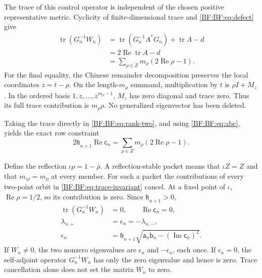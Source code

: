The trace of this control operator is independent of the chosen
positive representative metric.  Cyclicity of finite-dimensional
trace and \eqref{BF:BF:eq:defect} give
\begin{equation}
\begin{split}
\operatorname{tr}(G_n^{-1}W_n)
&=\operatorname{tr}(G_n^{-1}A^*G_n)
  +\operatorname{tr}A-d\\
&=2\operatorname{Re}\operatorname{tr}A-d\\
&=\sum_{\rho\in Z}m_\rho(2\operatorname{Re}\rho-1).
\end{split}
\tag{BF.23}\label{BF:BF:eq:trace-invariant}
\end{equation}
For the final equality, the Chinese remainder decomposition preserves
the local coordinates \(z=t-\rho\).  On the length-\(m_\rho\)
summand, multiplication by \(t\) is \(\rho I+M_z\).  In the ordered
basis \(1,z,\ldots,z^{m_\rho-1}\), \(M_z\) has zero diagonal and
trace zero.  Thus its full trace contribution is \(m_\rho\rho\).
No generalized eigenvector has been deleted.

Taking the trace directly in \eqref{BF:BF:eq:rank-two}, and using
\eqref{BF:BF:eq:abc}, yields the exact row constraint
\begin{equation}
\boxed{\;
2\mathfrak h_{n+1}\operatorname{Re}\mathsf c_n
 =\sum_{\rho\in Z}m_\rho(2\operatorname{Re}\rho-1).
\;}
\tag{BF.24}\label{BF:BF:eq:row-trace}
\end{equation}

Define the reflection \(\iota\rho=1-\bar\rho\).
A reflection-stable packet means that \(\iota Z=Z\) and that
\(m_{\iota\rho}=m_\rho\) at every member.
For such a packet the contributions of every two-point orbit in
\eqref{BF:BF:eq:trace-invariant} cancel.  At a fixed point of \(\iota\),
\(\operatorname{Re}\rho=1/2\), so its contribution is zero.
Since \(\mathfrak h_{n+1}>0\),
\begin{equation}
\begin{split}
\operatorname{tr}(G_n^{-1}W_n)&=0,
\qquad\operatorname{Re}\mathsf c_n=0,\\
\lambda_{n,+}&=\epsilon_n=-\lambda_{n,-},\\
\epsilon_n
 &=\mathfrak h_{n+1}
   \sqrt{\mathsf a_n\mathsf b_n-
                 (\operatorname{Im}\mathsf c_n)^2}.
\end{split}
\tag{BF.25}\label{BF:BF:eq:reflection-trace}
\end{equation}
If \(W_n\ne0\), the two nonzero eigenvalues are
\(\epsilon_n\) and \(-\epsilon_n\), each once.
If \(\epsilon_n=0\), the self-adjoint operator \(G_n^{-1}W_n\)
has only the zero eigenvalue and hence is zero.  Trace cancellation
alone does not set the matrix \(W_n\) to zero.

